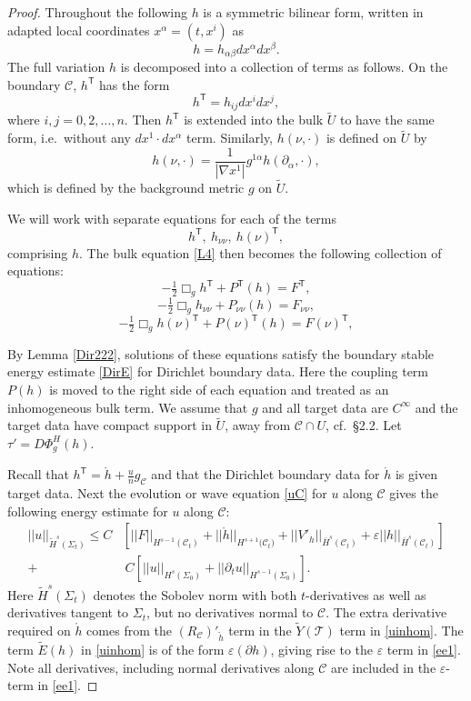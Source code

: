 \documentclass[10pt]{amsart}
\renewcommand{\a}{\alpha}
\renewcommand{\b}{\beta}
\newcommand{\e}{\varepsilon}
\newcommand{\Si}{\Sigma}
\newcommand{\cC}{{\mathcal C}}
\newcommand{\cT}{{\mathcal T}}
\newcommand{\tT}{\mathsf{T}}
\newcommand{\be}{\begin{equation}}
\newcommand{\ee}{\end{equation}}
\newcommand{\p}{\partial}
\newcommand{\<}{\langle}
\renewcommand{\>}{\rangle}
\newcommand{\w}{\widetilde}
\theoremstyle{plain}
\theoremstyle{remark}
\theoremstyle{definition}
\numberwithin{equation}{section}
\begin{document}
 \begin{proof} 
 
  Throughout the following $h$ is a symmetric bilinear form, written in adapted local coordinates $x^{\a} = (t, x^i)$ as 
$$h = h_{\a\b}dx^{\a}dx^{\b}.$$
The full variation $h$ is decomposed into a collection of terms as follows. On the boundary $\cC$, $h^{\tT}$ has the form 
$$h^{\tT} = h_{ij}dx^i dx^j,$$
where $i, j = 0, 2, \dots, n$. Then $h^{\tT}$ is extended into the bulk $\w U$ to have the same form, i.e.~without any $dx^1\cdot dx^{\a}$ 
term. Similarly, $h(\nu, \cdot)$ is defined on $\w U$ by 
\be \label{hnudef}
h(\nu, \cdot) = \frac{1}{|\nabla x^1|}g^{1 \a}h(\p_{\a}, \cdot),
\ee
which is defined by the background metric $g$ on $\w U$. 

   We will work with separate equations for each of the terms 
\be \label{comp}
h^{\tT}, \ h_{\nu \nu}, \ h(\nu)^{\tT},
\ee
comprising $h$. The bulk equation \eqref{L4} then becomes the following collection of equations: 
\be \label{e1}
-\tfrac{1}{2}\Box_g h^{\tT}  + P^{\tT}(h) = F^{\tT},
\ee
\be \label{e2}
-\tfrac{1}{2}\Box_g h_{\nu \nu}  + P_{\nu \nu}(h) = F_{\nu \nu},
\ee
\be \label{e3}
-\tfrac{1}{2}\Box_g h(\nu)^{\tT}  + P(\nu)^{\tT}(h) = F(\nu)^{\tT},
\ee

  By Lemma \ref{Dir222}, solutions of these equations satisfy the boundary stable energy estimate \eqref{DirE} for Dirichlet boundary data. 
Here the coupling term $P(h)$ is moved to the right side of each equation and treated as an inhomogeneous bulk term. We assume 
that $g$ and all target data are $C^{\infty}$ and the target data have compact support in $\w U$, away from $\cC \cap U$, cf.~\S 2.2. 
  Let $\tau' = D\Phi^H_g(h)$.
  
  Recall that $h^{\tT} = \ring{h} + \frac{u}{n}g_{\cC}$ and that the Dirichlet boundary data for $\ring{h}$ is given target data. 
Next the evolution or wave equation \eqref{uC} for $u$ along $\cC$ gives the following energy estimate for $u$ along $\cC$:
\be \label{ee1}
\begin{split}
||u||_{\w H^s(\Si_t)} \leq  C & [ ||F||_{H^{s-1}(\cC_t)} + ||\ring{h}||_{H^{s+1}({\cC_t)}} + ||V'_h||_{\bar H^s(\cC_t)} + \e ||h||_{\bar H^s(\cC_t)}] \\
+ & \ C[||u||_{H^s(\Si_0)} + ||\p_t u||_{H^{s-1}(\Si_0)}].
\end{split} 
\ee 
Here $\w H^s(\Si_t)$ denotes the Sobolev norm with both $t$-derivatives as well as derivatives tangent to $\Si_t$, but no derivatives normal to $\cC$. 
The extra derivative required on $\ring{h}$ comes from the $(R_{\cC})'_{\ring{h}}$ term in the $\w Y(\cT)$ term in \eqref{uinhom}. The term $\w E(h)$ in 
\eqref{uinhom} is of the form $\e(\p h)$, giving rise to the $\e$ term in \eqref{ee1}. Note all derivatives, including normal derivatives along $\cC$ are 
included in the $\e$-term in \eqref{ee1}.


\end{proof}
\end{document}
